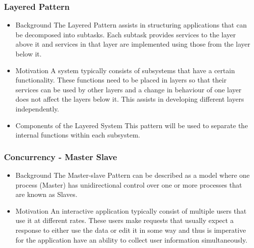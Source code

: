 \documentclass[a4paper,12pt]{article}
\begin{document}
\subsubsection{Layered Pattern}
\begin{itemize}
\item{Background}
\newline
\newline
The Layered Pattern assists in structuring applications that can be decomposed into subtasks. Each subtask provides services to the layer above it and services in that layer are implemented using those from the layer below it.
\newline
\item{Motivation}
\newline
\newline
A system typically consists of subsystems that have a certain functionality. These functions need to be placed in layers so that their services can be used by other layers and a change in behaviour of one layer does not affect the layers below it. This assists in developing different layers independently. 

\item{Components of the Layered System }
\newline
This pattern will be used to separate the internal functions within each subsystem.
\newline

\end{itemize}


\subsubsection{Concurrency - Master Slave}
\begin{itemize}
\item{Background}
\newline
\newline
The Master-slave Pattern can be described as  a model where one process (Master) has unidirectional control over one or more processes that are known as Slaves. 

\item{Motivation}
\newline
\newline
An interactive application typically consist of multiple users that use it at different rates. These users make requests that usually expect a response to either use the data or edit it in some way and thus is imperative for the application have an ability to collect user information simultaneously.

\end{itemize}
\end{document}
